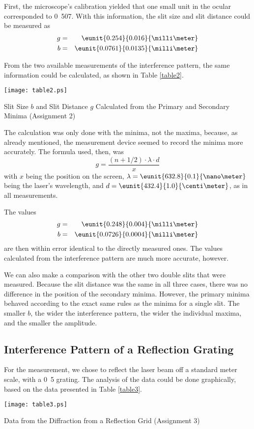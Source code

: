 \documentclass[a4paper,10pt]{article}
\begin{document}
First, the microscope's calibration yielded that one small unit in the ocular corresponded to \unit{0.507}{\milli\meter}. With this information, the slit size and slit distance could be measured as
\begin{eqnarray*}
g &=& \eunit{0.254}{0.016}{\milli\meter}\\
b &=& \eunit{0.0761}{0.0135}{\milli\meter}
\end{eqnarray*}

From the two available measurements of the interference pattern, the same information could be calculated, as shown in Table \ref{table2}.
\begin{table}[htbp]
    \centering
    \texttt{[image: table2.ps]}
\caption{Slit Size $b$ and Slit Distance $g$ Calculated from the Primary and Secondary Minima (Assignment 2)}
\label{table2}
\end{table}

The calculation was only done with the minima, not the maxima, because, as already mentioned, the measurement device seemed to record the minima more accurately. The formula used, then, was
\begin{equation}
g = \frac{(n+1/2) \cdot \lambda \cdot d}{x}
\end{equation}
with $x$ being the position on the screen, $\lambda = \eunit{632.8}{0.1}{\nano\meter}$ being the laser's wavelength, and $d = \eunit{432.4}{1.0}{\centi\meter}$, as in all measurements.

The values
\begin{eqnarray*}
g &=& \eunit{0.248}{0.004}{\milli\meter}\\
b &=& \eunit{0.0726}{0.0004}{\milli\meter}
\end{eqnarray*}
are then within error identical to the directly measured ones. The values calculated from the interference pattern are much more accurate, however.

We can also make a comparison with the other two double slits that were measured. Because the slit distance was the same in all three cases, there was no difference in the position of the secondary minima. However, the primary minima behaved according to the exact same rules as the minima for a single slit. The smaller $b$, the wider the interference pattern, the wider the individual maxima, and the smaller the amplitude.

\subsection{Interference Pattern of a Reflection Grating}
For the measurement, we chose to reflect the laser beam off a standard meter scale, with a \unit{0.5}{\milli\meter} grating.
The analysis of the data could be done graphically, based on the data presented in Table \ref{table3}.
\begin{table}[htbp]
    \centering
    \texttt{[image: table3.ps]}
\caption{Data from the Diffraction from a Reflection Grid (Assignment 3)}
\label{table3}
\end{table}
\end{document}

